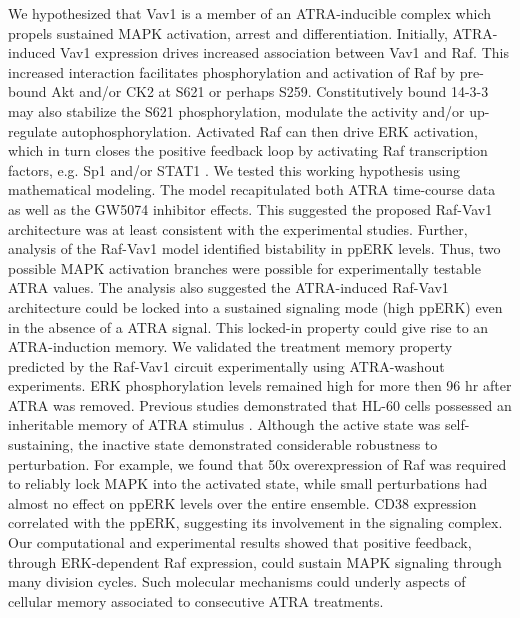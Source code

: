\documentclass[12pt]{article}
\begin{document}
We hypothesized that Vav1 is a member of an ATRA-inducible complex which propels sustained MAPK activation, arrest and differentiation.
Initially, ATRA-induced Vav1 expression drives increased association between Vav1 and Raf.
This increased interaction facilitates phosphorylation and activation of Raf by pre-bound Akt and/or CK2 at S621 or perhaps S259.
Constitutively bound 14-3-3 may also stabilize the S621 phosphorylation, modulate the activity and/or up-regulate autophosphorylation.
Activated Raf can then drive ERK activation, which in turn closes the positive feedback loop by activating Raf transcription factors,
e.g. Sp1 and/or STAT1 \cite{Kim2009,Milanini-Mongiat2002,Zhang2004,Li2006}.
We tested this working hypothesis using mathematical modeling.
The model recapitulated both ATRA time-course data as well as the GW5074 inhibitor effects.
This suggested the proposed Raf-Vav1 architecture was at least consistent with the experimental studies.
Further, analysis of the Raf-Vav1 model identified bistability in ppERK levels.
Thus, two possible MAPK activation branches were possible for experimentally testable ATRA values. The analysis also suggested the ATRA-induced Raf-Vav1 architecture could be locked into a
sustained signaling mode (high ppERK) even in the absence of a ATRA signal.
This locked-in property could give rise to an ATRA-induction memory.
We validated the treatment memory property predicted by the Raf-Vav1 circuit experimentally using ATRA-washout experiments.
ERK phosphorylation levels remained high for more then 96 hr after ATRA was removed.
Previous studies demonstrated that HL-60 cells possessed an inheritable memory of ATRA stimulus \cite{YEN1984}.
Although the active state was self-sustaining, the inactive state demonstrated considerable robustness to perturbation.
For example, we found that 50x overexpression of Raf was required to reliably lock MAPK into the activated state, while small perturbations had almost no effect on ppERK levels
over the entire ensemble.
CD38 expression correlated with the ppERK, suggesting its involvement in the signaling complex.
Our computational and experimental results showed that positive feedback,
through ERK-dependent Raf expression, could sustain MAPK signaling through many division cycles.
Such molecular mechanisms could underly aspects of cellular memory associated to consecutive ATRA treatments.
\end{document}
